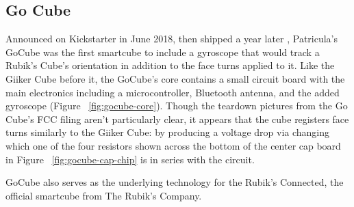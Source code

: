 \subsection{Go Cube}

Announced on Kickstarter in June 2018, then shipped a year later
\cite{gocube-kickstarter}, Patricula's GoCube was the first smartcube
to include a gyroscope that would track a Rubik's Cube's orientation in
addition to the face turns applied to it.
\cite{gocube-product-launch-video} Like the Giiker Cube before it, the
GoCube's core contains a small circuit board with the main electronics
including a microcontroller, Bluetooth antenna, and the added gyroscope
(Figure ~\ref{fig:gocube-core}). Though the teardown pictures from the
Go Cube's FCC filing aren't particularly clear, it appears that the
cube registers face turns similarly to the Giiker Cube: by producing a
voltage drop via changing which one of the four resistors shown across
the bottom of the center cap board in Figure ~\ref{fig:gocube-cap-chip}
is in series with the circuit.

GoCube also serves as the underlying technology for the Rubik's Connected, the official smartcube from The Rubik's Company. \cite{gocube-rubiksconnected}


